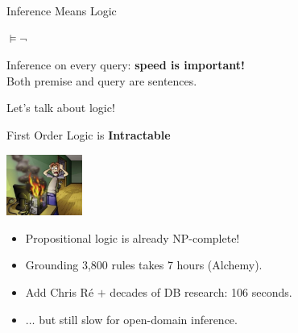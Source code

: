 
\begin{frame}{Inference Means Logic}
\begin{center}
 \textbf{$\vDash \lnot$} 
\end{center}
\pause
\vspace{2ex}

 Inference on every query: \textbf{speed is important!} \\
\pause
\vspace{2ex}
 Both premise and query are sentences. \\
\pause
\vspace{2ex}

 Let's talk about logic!
\end{frame}

\begin{frame}{First Order Logic is \textbf{Intractable}}
\begin{center}
  \includegraphics[height=2cm]{../img/overheating.jpg}
\end{center}

\begin{itemize}
  \item Propositional logic is already NP-complete!
\end{itemize}
\vspace{1ex}
\pause

\begin{itemize}
  \item Grounding 3,800 rules takes 7 hours (Alchemy).
  \pause
  \item Add Chris R\'{e} $+$ decades of DB research: 106 seconds.
  \item $\dots$ but still slow for open-domain inference.
\end{itemize}

\end{frame}

